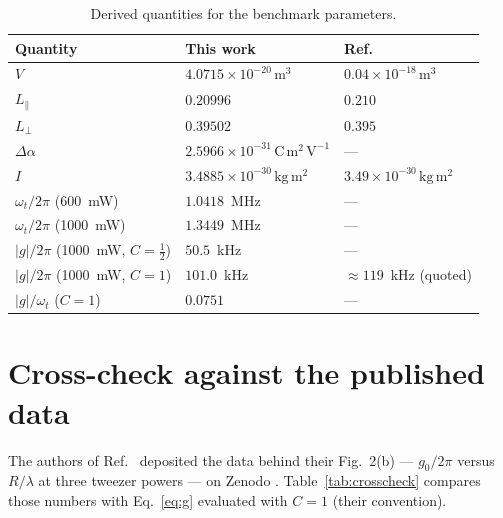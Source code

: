 \documentclass[11pt,a4paper]{article}
\newcommand{\dalpha}{\Delta\alpha}
\newcommand{\unit}[1]{\,\mathrm{#1}}
\begin{document}
\begin{table}[h]
\centering
\begin{tabular}{lll}
\toprule
Quantity & This work & Ref.~\cite{Zhang2025} \\
\midrule
$V$                       & $4.0715\times10^{-20}\unit{m^{3}}$ & $0.04\times10^{-18}\unit{m^{3}}$ \\
$L_{\parallel}$           & $0.20996$                          & $0.210$ \\
$L_{\perp}$               & $0.39502$                          & $0.395$ \\
$\dalpha$                 & $2.5966\times10^{-31}\unit{C\,m^{2}\,V^{-1}}$ & --- \\
$I$                       & $3.4885\times10^{-30}\unit{kg\,m^{2}}$ & $3.49\times10^{-30}\unit{kg\,m^{2}}$ \\
$\omega_t/2\pi$ (600~mW)  & $1.0418$~MHz & --- \\
$\omega_t/2\pi$ (1000~mW) & $1.3449$~MHz & --- \\
$|g|/2\pi$ (1000~mW, $C=\tfrac12$) & $50.5$~kHz & --- \\
$|g|/2\pi$ (1000~mW, $C=1$)        & $101.0$~kHz & $\approx119$~kHz (quoted) \\
$|g|/\omega_t$ ($C=1$)             & $0.0751$    & --- \\
\bottomrule
\end{tabular}
\caption{Derived quantities for the benchmark parameters.}
\label{tab:numbers}
\end{table}

\section{Cross-check against the published data}
\label{sec:crosscheck}

The authors of Ref.~\cite{Zhang2025} deposited the data behind their Fig.~2(b)
--- $g_0/2\pi$ versus $R/\lambda$ at three tweezer powers --- on Zenodo
\cite{Zenodo}.  Table~\ref{tab:crosscheck} compares those numbers with
Eq.~\eqref{eq:g} evaluated with $C=1$ (their convention).
\end{document}
